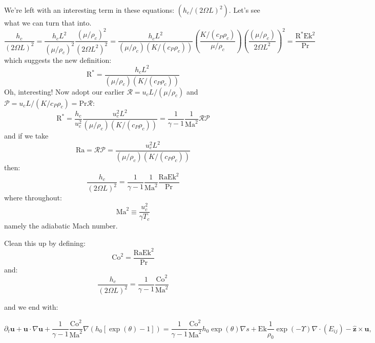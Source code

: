 \documentclass{aastex631}
\newcommand{\del}{\nabla}
\renewcommand{\vec}{\boldsymbol}
\newcommand{\scrR}{\mathcal{R}}
\newcommand{\scrP}{\mathcal{P}}
\begin{document}
We're left with an interesting term in these equations: $\left(h_c/(2\Omega L)^2\right)$.  Let's see what we can turn that into.
\begin{equation}
\frac{h_c}{(2\Omega L)^2}
= \frac{h_c L^2}{(\mu/\rho_c)^2} \frac{(\mu/\rho_c)^2}{(2\Omega L^2)^2}
= \frac{h_c L^2}{(\mu/\rho_c)(K/(c_P \rho_c))}\left(\frac{K/(c_P \rho_c)}{\mu/\rho_c}\right) \left(\frac{(\mu/\rho_c)}{2\Omega L^2}\right)^2
= \frac{\mathrm{R}^* \mathrm{Ek}^2}{\mathrm{Pr}}
\end{equation}
which suggests the new definition:
\begin{equation}
\mathrm{R}^* = \frac{h_c L^2}{(\mu/\rho_c)(K/(c_P \rho_c))}
\end{equation}
Oh, interesting!  Now adopt our earlier $\scrR = u_c L/(\mu/\rho_c)$ and $\scrP = u_c L/(K/c_P \rho_c) = \mathrm{Pr}\scrR$:
\begin{equation}
\mathrm{R}^* = \frac{h_c}{u_c^2}\frac{u_c^2 L^2}{(\mu/\rho_c)(K/(c_P \rho_c))} = \frac{1}{\gamma-1}\frac{1}{\mathrm{Ma}^{2}} \scrR \scrP
\end{equation}
and if we take
\begin{equation}
  \mathrm{Ra} = \scrR \scrP = \frac{u_c^2 L^2}{(\mu/\rho_c)(K/(c_P \rho_c))}
\end{equation}
then:
\begin{equation}
  \frac{h_c}{(2\Omega L)^2} = \frac{1}{\gamma-1}\frac{1}{\mathrm{Ma}^{2}}\frac{\mathrm{Ra}\mathrm{Ek}^2}{\mathrm{Pr}}
\end{equation}
where throughout:
\begin{equation}
  \mathrm{Ma}^{2} \equiv \frac{u_c^2}{\gamma T_c}
\end{equation}
namely the adiabatic Mach number.

Clean this up by defining:
\begin{equation}
  \mathrm{Co}^2 = \frac{\mathrm{Ra}\mathrm{Ek}^2}{\mathrm{Pr}}
\end{equation}
and:
\begin{equation}
  \frac{h_c}{(2\Omega L)^2} = \frac{1}{\gamma-1}\frac{\mathrm{Co}^2}{\mathrm{Ma}^{2}}
\end{equation}

and we end with:

\begin{equation}
  \partial_t \vec{u} + \vec{u}\cdot \del \vec{u} + \frac{1}{\gamma-1}\frac{\mathrm{Co}^2}{\mathrm{Ma}^{2}}\del (h_0[\exp(\theta)-1]) =
  \frac{1}{\gamma-1}\frac{\mathrm{Co}^2}{\mathrm{Ma}^{2}} h_0\exp(\theta)\del s
  + \mathrm{Ek}\frac{1}{\rho_0}\exp(-\Upsilon)\del\cdot (E_{ij}) - \vec{\hat{z}} \times \vec{u},
\end{equation}
\end{document}
